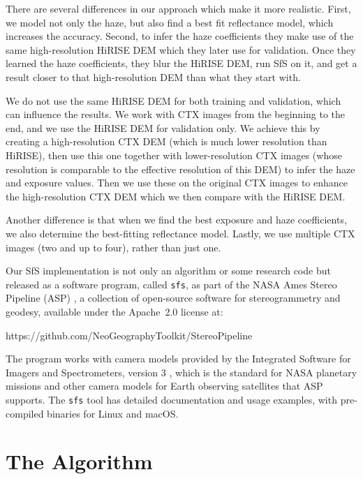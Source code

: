 \documentclass[draft,linenumbers]{agujournal}
\begin{document}
There are several differences in our approach which make it more realistic. First, we model not only the haze, but also find a best fit reflectance model, which increases the accuracy. Second, to infer the haze coefficients they make use of the same high-resolution HiRISE DEM which they later use for validation. Once they learned the haze coefficients, they blur the HiRISE DEM, run SfS on it, and get a result closer to that high-resolution DEM than what they start with. 

We do not use the same HiRISE DEM for both training and validation, which can influence the results. We work with CTX images from the beginning to the end, and we use the HiRISE DEM for validation only. We achieve this by creating a high-resolution CTX DEM (which is much lower resolution than HiRISE), then use this one together with lower-resolution CTX images (whose resolution is comparable to the effective resolution of this DEM) to infer the haze and exposure values. Then we use these on the original CTX images to enhance the high-resolution CTX DEM which we then compare with the HiRISE DEM.  

Another difference is that when we find the best exposure and haze coefficients, we also determine the best-fitting reflectance model. Lastly, we use multiple CTX images (two and up to four), rather than just one. 

Our SfS implementation is not only an algorithm or some research code but released as a software program, called \texttt{sfs}, as part
of the NASA Ames Stereo Pipeline (ASP) \citep{ASP2017}, a collection of
open-source software for stereogrammetry and geodesy, available
under the Apache~2.0 license at: \\

\begin{center}
https://github.com/NeoGeographyToolkit/StereoPipeline
\end{center}

The program works with camera models provided by the Integrated
Software for Imagers and Spectrometers, version 3 \citep[ISIS3,][]{2017LPI....48.2739S,ISIS_website},
which is the standard for NASA planetary missions and other camera models for Earth observing satellites that ASP supports. The \texttt{sfs} tool has detailed documentation
and usage examples, with pre-compiled binaries for Linux and macOS.

\section{The Algorithm}
\end{document}
